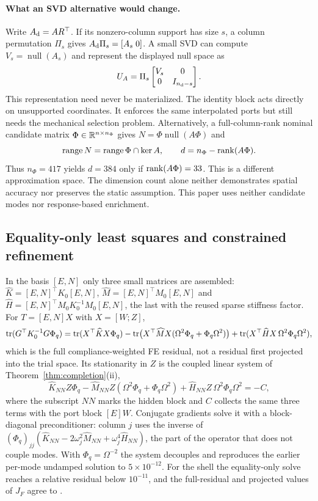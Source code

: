 \paragraph{What an SVD alternative would change.}
Write $A_{\rm d}=AR^{\top}$. If its nonzero-column support has size $s$, a
column permutation $\Pi_s$ gives $A_{\rm d}\Pi_s=[A_s\;0]$. A small SVD can
compute $V_s=\operatorname{null}(A_s)$ and represent the displayed null
space as
\[
 U_A=\Pi_s\begin{bmatrix}V_s&0\\0&I_{n_{\rm d}-s}\end{bmatrix}.
\]
This representation need never be materialized. The identity block acts
directly on unsupported coordinates. It enforces the same interpolated
ports but still needs the mechanical selection problem.
Alternatively, a full-column-rank nominal candidate matrix
$\Phi\in\mathbb R^{n\times n_\Phi}$ gives $N=\Phi\operatorname{null}(A\Phi)$ and
\[
 \operatorname{range} N=\operatorname{range}\Phi\cap\ker A,\qquad
 d=n_\Phi-\operatorname{rank}(A\Phi).
\]
Thus $n_\Phi=417$ yields $d=384$ only if $\operatorname{rank}(A\Phi)=33$. This is a
different approximation space. The dimension count alone neither
demonstrates spatial accuracy nor preserves the static assumption. This
paper uses neither candidate modes nor response-based enrichment.

\subsection{Equality-only least squares and constrained refinement}\label{sec:constrained}
In the basis $[E,N]$ only three small matrices are assembled:
$\widehat K=[E,N]^{\top}K_0[E,N]$, $\widehat M=[E,N]^{\top}M_0[E,N]$ and
$\widehat H=[E,N]^{\top}M_0K_0^{-1}M_0[E,N]$, the last with the reused
sparse stiffness factor. For $T=[E,N]X$ with $X=[W;Z]$,
\[
 \operatorname{tr}(G^{\top}K_0^{-1}G\Phi_q)=\operatorname{tr}(X^{\top}\widehat KX\Phi_q)
 -\operatorname{tr}\bigl(X^{\top}\widehat MX(\Omega^2\Phi_q+\Phi_q\Omega^2)\bigr)
 +\operatorname{tr}(X^{\top}\widehat HX\,\Omega^2\Phi_q\Omega^2),
\]
which is the full compliance-weighted FE residual, not a residual first
projected into the trial space. Its stationarity in $Z$ is the coupled
linear system of Theorem~\ref{thm:completion}(ii),
\begin{equation}
 \widehat K_{NN}Z\Phi_q-\widehat M_{NN}Z(\Omega^2\Phi_q+\Phi_q\Omega^2)
 +\widehat H_{NN}Z\,\Omega^2\Phi_q\Omega^2=-C,
 \label{eq:coefficient-solve}
\end{equation}
where the subscript $NN$ marks the hidden block and $C$ collects the same
three terms with the port block $[E]W$. Conjugate gradients solve it with
a block-diagonal preconditioner: column $j$ uses the inverse of
$(\Phi_q)_{jj}(\widehat K_{NN}-2\omega_j^2\widehat M_{NN}+\omega_j^4\widehat H_{NN})$,
the part of the operator that does not couple modes. With
$\Phi_q=\Omega^{-2}$ the system decouples and reproduces the earlier
per-mode undamped solution to $5\times10^{-12}$. For the shell the
equality-only solve reaches a relative residual below $10^{-11}$, and the
full-residual and projected values of $J_F$ agree to
\LabProjectionAgreement.

